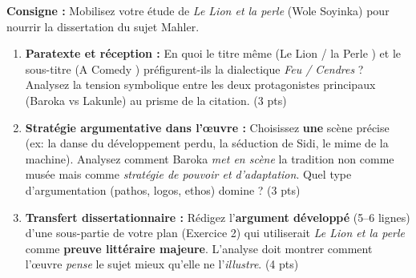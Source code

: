 \documentclass[11pt]{article}
\begin{document}
\begin{exercice}
\textbf{Consigne :} Mobilisez votre étude de \textit{Le Lion et la perle} (Wole Soyinka) pour nourrir la dissertation du sujet Mahler.

\begin{enumerate}
    \item \textbf{Paratexte et réception :} En quoi le titre même (\og Le Lion \fg{} / \og la Perle \fg{}) et le sous-titre (\og A Comedy \fg{}) préfigurent-ils la dialectique \textit{Feu / Cendres} ? Analysez la tension symbolique entre les deux protagonistes principaux (Baroka vs Lakunle) au prisme de la citation. (3 pts)
    \item \textbf{Stratégie argumentative dans l'œuvre :} Choisissez \textbf{une} scène précise (ex: la danse du développement perdu, la séduction de Sidi, le mime de la machine). Analysez comment Baroka \textit{met en scène} la tradition non comme musée mais comme \textit{stratégie de pouvoir et d'adaptation}. Quel type d'argumentation (pathos, logos, ethos) domine ? (3 pts)
    \item \textbf{Transfert dissertationnaire :} Rédigez l'\textbf{argument développé} (5--6 lignes) d'une sous-partie de votre plan (Exercice 2) qui utiliserait \textit{Le Lion et la perle} comme \textbf{preuve littéraire majeure}. L'analyse doit montrer comment l'œuvre \textit{pense} le sujet mieux qu'elle ne l'\textit{illustre}. (4 pts)
\end{enumerate}
\end{exercice}
\end{document}
